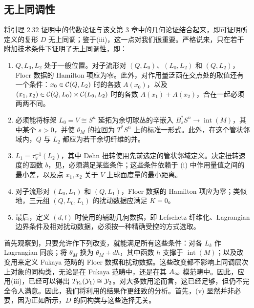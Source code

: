 \subsection{无上同调性}\label{sec:17h}
将引理 2.32 证明中的代数论证与该文第 3 章中的几何论证结合起来，即可证明所定义的复形 $D$ 无上同调；鉴于(iii)，这一点对我们很重要。严格说来，只在若干附加技术条件下证明了无上同调性，即：
\begin{enumerate}[label=(\roman*)]
\item $Q,L_0,L_2$ 处于一般位置。对子流形对 $(Q,L_0)$、$(L_0,L_2)$ 和 $(Q,L_2)$，Floer 数据的 Hamilton 项应为零。此外，对作用量泛函在交点处的取值还有一个条件：$x_0\in\mathcal C(Q,L_2)$ 时的各数 $A(x_0)$，以及 $(x_1,x_2)\in\mathcal C(Q,L_0)\times\mathcal C(L_0,L_2)$ 时的各数 $A(x_1)+A(x_2)$，合在一起必须两两不同。
\item 必须能将标架 $L_0=V\cong S^n$ 延拓为余切球丛的辛嵌入 $B_s^*S^n\to\operatorname{int}(M)$，其中某个 $s>0$，并使 $\theta_M$ 的拉回为 $T^*S^n$ 上的标准一形式。此外，在这个管状邻域内，$Q$ 与 $L_2$ 都应为若干余切纤维的并。
\item $L_1=\tau_V^{-1}(L_2)$，其中 Dehn 扭转使用先前选定的管状邻域定义。决定扭转速度的函数 $b$，见，必须满足某些条件；这些条件依赖于 (i) 中作用量值之间的最小差，以及点 $x_1,x_2$ 关于 $V$ 上球面度量的最小距离。
\item 对子流形对 $(L_0,L_1)$ 和 $(Q,L_1)$，Floer 数据的 Hamilton 项应为零；类似地，三元组 $(Q,L_0,L_1)$ 的扰动数据应满足 $K=0$。
\item 最后，定义 $(d,l)$ 时使用的辅助几何数据，即 Lefschetz 纤维化、Lagrangian 边界条件及相对扰动数据，必须按一种精确受控的方式选取。
\end{enumerate}
首先观察到，只要允许作下列改变，就能满足所有这些条件：对各 $L_k$ 作 Lagrangian 同痕；将 $\theta_M$ 换为 $\theta_M+dh$，其中函数 $h$ 支撑于 $\operatorname{int}(M)$；以及改变用来定义 Fukaya 范畴的 Floer 数据和扰动数据。这些改变都不影响上同调层次上对象的同构类，无论是在 Fukaya 范畴中，还是在其 $A_\infty$ 模范畴中。因此，应用(iii)，已经可以得出 $T_{Y_0}(\mathcal Y_1)\cong\mathcal Y_2$。对大多数用途而言，这已经足够，但仍不完全令人满意。因此，我们将利用的结果作更细致的分析。首先，(v) 显然并非必要，因为正如所示，$D$ 的同构类与这些选择无关。

